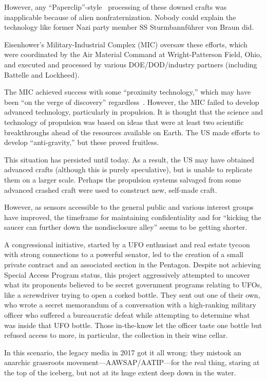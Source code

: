 However, any ``Paperclip''-style~\cite{Jacobsen2014} processing of these downed crafts was inapplicable because of alien nonfraternization. Nobody could explain the technology like former Nazi party member SS Sturmbannf\"uhrer von Braun did.


Eisenhower's Military-Industrial Complex (MIC) oversaw these efforts, which were coordinated by the Air Material Command at Wright-Patterson Field, Ohio, and executed and processed by various DOE/DOD/industry partners (including Battelle and Lockheed).

The MIC achieved success with some ``proximity technology,'' which may have been ``on the verge of discovery'' regardless~\cite{Corso,Corso1998Jun}. However, the MIC failed to develop advanced technology, particularly in propulsion. It is thought that the science and technology of propulsion was based on ideas that were at least two scientific breakthroughs ahead of the resources available on Earth. The US made efforts to develop ``anti-gravity,'' but these proved fruitless.

This situation has persisted until today. As a result, the US may have obtained advanced crafts (although this is purely speculative), but is unable to replicate them on a larger scale. Perhaps the propulsion systems salvaged from some advanced crashed craft were used to construct new, self-made craft.

However, as sensors accessible to the general public and various interest groups have improved, the timeframe
for maintaining confidentiality and for ``kicking the saucer can further down the nondisclosure alley'' seems to be getting shorter.

A congressional initiative, started by a UFO enthusiast and real estate tycoon with strong connections to a powerful senator, led to the creation of a small private contract and an associated section in the Pentagon. Despite not achieving Special Access Program status, this project aggressively attempted to uncover what its proponents believed to be secret government programs relating to UFOs, like a screwdriver trying to open a corked bottle. They sent out one of their own, who wrote a secret memorandum of a conversation with a high-ranking military officer who suffered a bureaucratic defeat while attempting to determine what was inside that UFO bottle. Those in-the-know let the officer taste one bottle but refused access to more, in particular, the collection in their wine cellar.

In this scenario, the legacy media in 2017 got it all wrong: they mistook an anarchic grassroots movement---AAWSAP/AATIP---for the real thing, staring at the top of the iceberg, but not at its huge extent deep down in the water.

